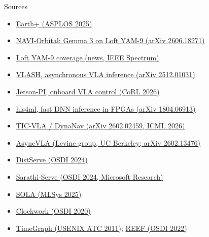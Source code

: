 \documentclass[11pt,aspectratio=43]{beamer}
\begin{document}
\begin{frame}[shrink=10]{Sources}

\footnotesize
\begin{itemize}
  \setlength{\itemsep}{0.25em}
  \item \href{https://arxiv.org/abs/2403.11434}{Earth+ (ASPLOS 2025)}
  \item \href{https://arxiv.org/abs/2606.18271}{NAVI-Orbital: Gemma 3 on Loft YAM-9 (arXiv 2606.18271)}
  \item \href{https://spectrum.ieee.org/nasa-ai-satellite-image-analysis}{Loft YAM-9 coverage (news, IEEE Spectrum)}
  \item \href{https://arxiv.org/abs/2512.01031}{VLASH, asynchronous VLA inference (arXiv 2512.01031)}
  \item \href{https://arxiv.org/abs/2607.12659}{Jetson-PI, onboard VLA control (CoRL 2026)}
  \item \href{https://arxiv.org/abs/1804.06913}{hls4ml, fast DNN inference in FPGAs (arXiv 1804.06913)}
  \item \href{https://arxiv.org/abs/2602.02459}{TIC-VLA / DynaNav (arXiv 2602.02459, ICML 2026)}
  \item \href{https://arxiv.org/abs/2602.13476}{AsyncVLA (Levine group, UC Berkeley; arXiv 2602.13476)}
  \item \href{https://www.usenix.org/conference/osdi24/presentation/zhong-yinmin}{DistServe (OSDI 2024)}
  \item \href{https://www.usenix.org/conference/osdi24/presentation/agrawal}{Sarathi-Serve (OSDI 2024, Microsoft Research)}
  \item \href{https://mlsys.org/virtual/2025/3345}{SOLA (MLSys 2025)}
  \item \href{https://www.usenix.org/conference/osdi20/presentation/gujarati}{Clockwork (OSDI 2020)}
  \item \href{https://www.usenix.org/conference/usenixatc11/timegraph-gpu-scheduling-real-time-multi-tasking-environments}{TimeGraph (USENIX ATC 2011)}; \href{https://www.usenix.org/conference/osdi22/presentation/han}{REEF (OSDI 2022)}
\end{itemize}

\end{frame}
\end{document}
